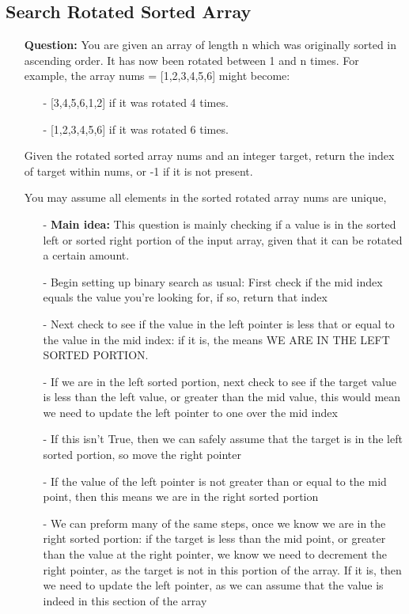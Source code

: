 \documentclass[12pt]{article}
\begin{document}
\subsection{Search Rotated Sorted Array}
\begin{enumerate}
  \item[] \textbf{Question:} You are given an array of length n which was originally sorted in ascending order. It has now been rotated between 1 and n times. For example, the array nums = [1,2,3,4,5,6] might become: 
\begin{enumerate}
  \item[-] [3,4,5,6,1,2] if it was rotated 4 times.
  \item[-] [1,2,3,4,5,6] if it was rotated 6 times.
\end{enumerate}

Given the rotated sorted array nums and an integer target, return the index of target within nums, or -1 if it is not present.

You may assume all elements in the sorted rotated array nums are unique,


    \begin{enumerate}
      \item[-] \textbf{Main idea:} This question is mainly checking if a value is in the sorted left or sorted right portion of the input array, given that it can be rotated a certain amount.
      \item[-] Begin setting up binary search as usual: First check if the mid index equals the value you're looking for, if so, return that index 
      \item[-] Next check to see if the value in the left pointer is less that or equal to the value in the mid index: if it is, the means WE ARE IN THE LEFT SORTED PORTION.
      \item[-] If we are in the left sorted portion, next check to see if the target value is less than the left value, or greater than the mid value, this would mean we need to update the left pointer to one over the mid index
      \item[-] If this isn't True, then we can safely assume that the target is in the left sorted portion, so move the right pointer
      \item[-] If the value of the left pointer is not greater than or equal to the mid point, then this means we are in the right sorted portion 
      \item[-] We can preform many of the same steps, once we know we are in the right sorted portion: if the target is less than the mid point, or greater than the value at the right pointer, we know we need to decrement the right pointer, as the target is not in this portion of the array. If it is, then we need to update the left pointer, as we can assume that the value is indeed in this section of the array

    \end{enumerate}
\end{enumerate}
\end{document}
